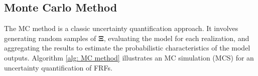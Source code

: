 %
%

\subsection{Monte Carlo Method}
\label{ssec: MC method}

The MC method is a classic uncertainty quantification approach.
It involves generating random samples of $\mathbf{\Xi}$, evaluating the model for each realization, and aggregating the results to estimate the probabilistic characteristics of the model outputs.
Algorithm \ref{alg: MC method} illustrates an MC simulation (MCS) for an uncertainty quantification of FRFs.
